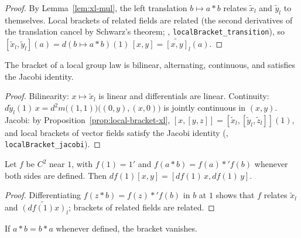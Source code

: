 \begin{proof}
  \leanok
  By Lemma~\ref{lem:xl-mul}, the left translation $b \mapsto a * b$ relates $\tilde x_l$ and
  $\tilde y_l$ to themselves. Local brackets of related fields are related (the second
  derivatives of the translation cancel by Schwarz's theorem; \cite{LCM},
  \texttt{localBracket\_transition}), so
  $[\tilde x_l, \tilde y_l](a) = d(b \mapsto a * b)(1)\,[x, y] = \widetilde{[x, y]}_l(a)$.
\end{proof}

\begin{theorem}
  \label{thm:local-lie}
  \leanok
  The bracket of a local group law is bilinear, alternating, continuous, and satisfies the
  Jacobi identity.
\end{theorem}

\begin{proof}
  \leanok
  Bilinearity: $x \mapsto \tilde x_l$ is linear and differentials are linear. Continuity:
  $d\tilde y_l(1)\,x = d^2 m\bigl((1, 1)\bigr)\bigl((0, y), (x, 0)\bigr)$ is jointly continuous
  in $(x, y)$. Jacobi: by Proposition~\ref{prop:local-bracket-xl},
  $[x, [y, z]] = [\tilde x_l, [\tilde y_l, \tilde z_l]](1)$, and local brackets of vector fields
  satisfy the Jacobi identity (\cite{LCM}, \texttt{localBracket\_jacobi}).
\end{proof}

\begin{proposition}
  \label{prop:local-hom}
  \leanok
  Let $f$ be $C^2$ near $1$, with $f(1) = 1'$ and $f(a * b) = f(a) *' f(b)$ whenever both
  sides are defined. Then $df(1)[x, y] = [df(1)\,x, df(1)\,y]$.
\end{proposition}

\begin{proof}
  \leanok
  Differentiating $f(z * b) = f(z) *' f(b)$ in $b$ at $1$ shows that $f$ relates $\tilde x_l$
  and $\widetilde{(df(1)x)}_l$; brackets of related fields are related.
\end{proof}

\begin{proposition}
  \label{prop:local-comm}
  \leanok
  If $a * b = b * a$ whenever defined, the bracket vanishes.
\end{proposition}

